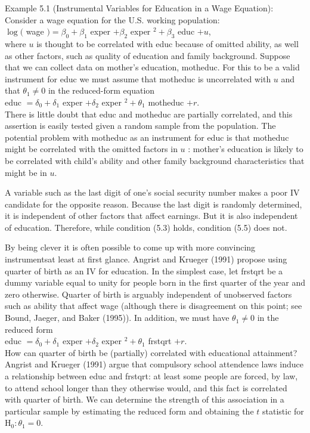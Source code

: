 \documentclass[10pt]{article}
\begin{document}
Example 5.1 (Instrumental Variables for Education in a Wage Equation): Consider a wage equation for the U.S. working population:\\
$\log ($ wage $)=\beta_{0}+\beta_{1}$ exper $+\beta_{2}$ exper $^{2}+\beta_{3}$ educ $+u$,\\
where $u$ is thought to be correlated with educ because of omitted ability, as well as other factors, such as quality of education and family background. Suppose that we can collect data on mother's education, motheduc. For this to be a valid instrument for educ we must assume that motheduc is uncorrelated with $u$ and that $\theta_{1} \neq 0$ in the reduced-form equation\\
educ $=\delta_{0}+\delta_{1}$ exper $+\delta_{2}$ exper $^{2}+\theta_{1}$ motheduc $+r$.\\
There is little doubt that educ and motheduc are partially correlated, and this assertion is easily tested given a random sample from the population. The potential problem with motheduc as an instrument for educ is that motheduc might be correlated with the omitted factors in $u$ : mother's education is likely to be correlated with child's ability and other family background characteristics that might be in $u$.

A variable such as the last digit of one's social security number makes a poor IV candidate for the opposite reason. Because the last digit is randomly determined, it is independent of other factors that affect earnings. But it is also independent of education. Therefore, while condition (5.3) holds, condition (5.5) does not.

By being clever it is often possible to come up with more convincing instrumentsat least at first glance. Angrist and Krueger (1991) propose using quarter of birth as an IV for education. In the simplest case, let frstqrt be a dummy variable equal to unity for people born in the first quarter of the year and zero otherwise. Quarter of birth is arguably independent of unobserved factors such as ability that affect wage (although there is disagreement on this point; see Bound, Jaeger, and Baker (1995)). In addition, we must have $\theta_{1} \neq 0$ in the reduced form\\
educ $=\delta_{0}+\delta_{1}$ exper $+\delta_{2}$ exper $^{2}+\theta_{1}$ frstqrt $+r$.\\
How can quarter of birth be (partially) correlated with educational attainment? Angrist and Krueger (1991) argue that compulsory school attendence laws induce a relationship between educ and frstqrt: at least some people are forced, by law, to attend school longer than they otherwise would, and this fact is correlated with quarter of birth. We can determine the strength of this association in a particular sample by estimating the reduced form and obtaining the $t$ statistic for $\mathrm{H}_{0}: \theta_{1}=0$.
\end{document}
